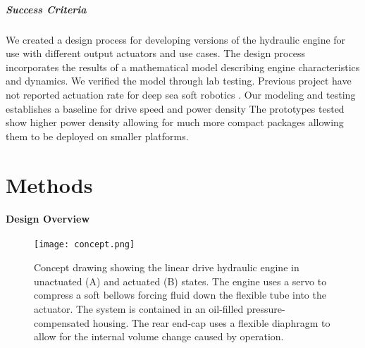 
\hypertarget{ch1:success-criteria}{%
\subparagraph{Success Criteria}\label{ch1:success-criteria}}


We created a design process for developing versions of the hydraulic
engine for use with different output actuators and use cases. The design
process incorporates the results of a mathematical model describing
engine characteristics and dynamics. We verified the model through lab
testing. Previous project have not reported actuation rate for deep sea
soft robotics \cite{li2023bioinspired}. Our modeling and testing establishes a baseline
for drive speed and power density The prototypes tested show higher
power density allowing for much more compact packages allowing them to
be deployed on smaller platforms.

\hypertarget{ch1:methods}{%
\section{Methods}\label{ch1:methods}}



\hypertarget{ch1:design-overview}{%
\paragraph{Design Overview}\label{ch1:design-overview}}

\begin{figure}
\hypertarget{ch1:fig:drawing}{%
\centering
\texttt{[image: concept.png]}
\caption{Concept drawing showing the linear drive hydraulic engine in
unactuated (A) and actuated (B) states. The engine uses a servo to
compress a soft bellows forcing fluid down the flexible tube into the
actuator. The system is contained in an oil-filled pressure-compensated
housing. The rear end-cap uses a flexible diaphragm to allow for the
internal volume change caused by operation.}\label{ch1:fig:drawing}
}
\end{figure}

